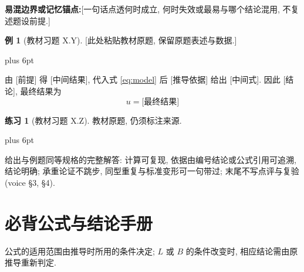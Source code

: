 \documentclass[11pt,a4paper]{article}
\makeatletter
\theoremstyle{definition}
\newtheorem{conclusion}[conclusion]{结论}
\newtheorem{example}[example]{例}
\newtheorem{exercise}[exercise]{练习}
\theoremstyle{remark}
\newenvironment{solution}[1][\solutionname]{\par
  \pushQED{\qed}%
  \normalfont \topsep=6pt plus 6pt\relax
  \trivlist
  \item[\hskip\labelsep\bfseries\color{primary}#1\@addpunct{.}]\ignorespaces
}{%
  \popQED\endtrivlist\@endpefalse
}
\newcommand{\solutionname}{解}
\numberwithin{equation}{section}
\newcommand{\takeaway}[2]{%
  \vspace{6pt}\noindent\colorbox{boxbg}{%
    \parbox{\dimexpr\textwidth-2\fboxsep\relax}{%
      \vspace{4pt}\textbf{\color{primary}#1:}\hspace{0.5em}#2\vspace{4pt}%
    }%
  }\vspace{6pt}%
}
\newcounter{geofig}[section]
\renewcommand{\thegeofig}{\thesection.\arabic{geofig}}
\newenvironment{geofig}[2]{%
  \par\medskip\noindent\begin{minipage}{\textwidth}\centering
  \refstepcounter{geofig}\label{#1}%
  \def\geofigcaption{#2}%
}{%
  \par\vspace{3pt}{\small\color{geoline}\textbf{图~\thegeofig}\quad\geofigcaption}\par
  \end{minipage}\par\medskip
}
\makeatother
\begin{document}
\takeaway{易混边界或记忆锚点}{[一句话点透何时成立, 何时失效或最易与哪个结论混用, 不复述题设前提.]}



\begin{example}[教材习题 X.Y]
[此处粘贴教材原题, 保留原题表述与数据.]
\end{example}
\begin{solution}
由 [前提] 得 [中间结果], 代入式 \eqref{eq:model} 后 [推导依据] 给出 [中间式]. 因此 [结论], 最终结果为
\[
\boxed{u = \text{[最终结果]}}
\]
\end{solution}

\begin{exercise}[教材习题 X.Z]
教材原题, 仍须标注来源.
\end{exercise}
\begin{solution}
给出与例题同等规格的完整解答: 计算可复现, 依据由编号结论或公式引用可追溯, 结论明确; 承重论证不跳步, 同型重复与标准变形可一句带过; 末尾不写点评与复验 (voice §3, §4).
\end{solution}


\section{必背公式与结论手册}
公式的适用范围由推导时所用的条件决定; $L$ 或 $B$ 的条件改变时, 相应结论需由原推导重新判定.
\end{document}
